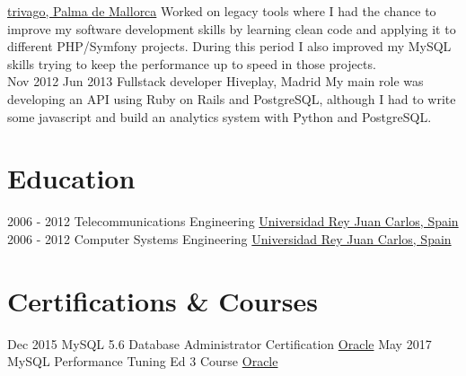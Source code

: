 \documentclass[letterpaper]{twentysecondcv} %
\begin{document}
\begin{twenty}
        {\href{https://www.trivago.com}{trivago, Palma de Mallorca}}
        {Worked on legacy tools where I had the chance to improve my software development skills by learning clean code and applying it to different PHP/Symfony projects. During this period I also improved my MySQL skills trying to keep the performance up to speed in those projects.}
        \\
\twentyitem
    	{Nov 2012}
	{Jun 2013}
        {Fullstack developer}
        {Hiveplay, Madrid}
	{My main role was developing an API using Ruby on Rails and PostgreSQL, although I had to write some javascript and build an analytics system with Python and PostgreSQL.}
        \\
\end{twenty}

\section{Education}

\begin{twenty} %
	\twentyitem
    	{2006 - 2012}
        {}
        {Telecommunications Engineering}
        {\href{https://www.urjc.es/}{Universidad Rey Juan Carlos, Spain}}
        {}
        {}
	\twentyitem
    	{2006 - 2012}
		{}
        {Computer Systems Engineering}
        {\href{https://www.urjc.es/}{Universidad Rey Juan Carlos, Spain}}
        {}
        {}
\end{twenty}

\section{Certifications \& Courses}

\begin{twenty} %
	\twentyitem
    	{Dec 2015}
        {}
        {MySQL 5.6 Database Administrator Certification}
        {\href{https://education.oracle.com/pls/web_prod-plq-dad/db_pages.getpage?page_id=5001&get_params=p_exam_id:1Z0-883}{Oracle}}
        {}
        {}
	\twentyitem
    	{May 2017}
		{}
        {MySQL Performance Tuning Ed 3 Course}
        {\href{https://education.oracle.com/pls/web_prod-plq-dad/db_pages.getpage?page_id=609&get_params=dc:D66439,clang:EN}{Oracle}}
        {}
        {}
\end{twenty}
\end{document}
